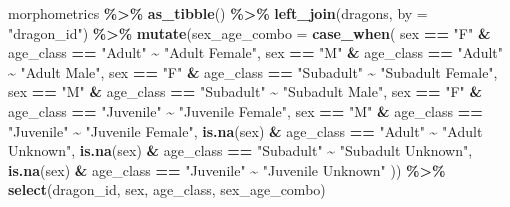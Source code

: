 \documentclass[
]{book}
\newenvironment{Shaded}{\begin{snugshade}}{\end{snugshade}}
\newcommand{\AttributeTok}[1]{\textcolor[rgb]{0.13,0.29,0.53}{#1}}
\newcommand{\FunctionTok}[1]{\textcolor[rgb]{0.13,0.29,0.53}{\textbf{#1}}}
\newcommand{\NormalTok}[1]{#1}
\newcommand{\SpecialCharTok}[1]{\textcolor[rgb]{0.81,0.36,0.00}{\textbf{#1}}}
\newcommand{\StringTok}[1]{\textcolor[rgb]{0.31,0.60,0.02}{#1}}
\begin{document}
\begin{Shaded}
\begin{Highlighting}[]
\NormalTok{morphometrics }\SpecialCharTok{\%\textgreater{}\%} 
  \FunctionTok{as\_tibble}\NormalTok{() }\SpecialCharTok{\%\textgreater{}\%} 
  \FunctionTok{left\_join}\NormalTok{(dragons, }\AttributeTok{by =} \StringTok{"dragon\_id"}\NormalTok{) }\SpecialCharTok{\%\textgreater{}\%} 
  \FunctionTok{mutate}\NormalTok{(}\AttributeTok{sex\_age\_combo =} \FunctionTok{case\_when}\NormalTok{(}
\NormalTok{    sex }\SpecialCharTok{==} \StringTok{"F"} \SpecialCharTok{\&}\NormalTok{ age\_class }\SpecialCharTok{==} \StringTok{"Adult"} \SpecialCharTok{\textasciitilde{}} \StringTok{"Adult Female"}\NormalTok{,}
\NormalTok{    sex }\SpecialCharTok{==} \StringTok{"M"} \SpecialCharTok{\&}\NormalTok{ age\_class }\SpecialCharTok{==} \StringTok{"Adult"} \SpecialCharTok{\textasciitilde{}} \StringTok{"Adult Male"}\NormalTok{,}
\NormalTok{    sex }\SpecialCharTok{==} \StringTok{"F"} \SpecialCharTok{\&}\NormalTok{ age\_class }\SpecialCharTok{==} \StringTok{"Subadult"} \SpecialCharTok{\textasciitilde{}} \StringTok{"Subadult Female"}\NormalTok{,}
\NormalTok{    sex }\SpecialCharTok{==} \StringTok{"M"} \SpecialCharTok{\&}\NormalTok{ age\_class }\SpecialCharTok{==} \StringTok{"Subadult"} \SpecialCharTok{\textasciitilde{}} \StringTok{"Subadult Male"}\NormalTok{,}
\NormalTok{    sex }\SpecialCharTok{==} \StringTok{"F"} \SpecialCharTok{\&}\NormalTok{ age\_class }\SpecialCharTok{==} \StringTok{"Juvenile"} \SpecialCharTok{\textasciitilde{}} \StringTok{"Juvenile Female"}\NormalTok{,}
\NormalTok{    sex }\SpecialCharTok{==} \StringTok{"M"} \SpecialCharTok{\&}\NormalTok{ age\_class }\SpecialCharTok{==} \StringTok{"Juvenile"} \SpecialCharTok{\textasciitilde{}} \StringTok{"Juvenile Female"}\NormalTok{,}
    \FunctionTok{is.na}\NormalTok{(sex) }\SpecialCharTok{\&}\NormalTok{ age\_class }\SpecialCharTok{==} \StringTok{"Adult"} \SpecialCharTok{\textasciitilde{}} \StringTok{"Adult Unknown"}\NormalTok{,}
    \FunctionTok{is.na}\NormalTok{(sex) }\SpecialCharTok{\&}\NormalTok{ age\_class }\SpecialCharTok{==} \StringTok{"Subadult"} \SpecialCharTok{\textasciitilde{}} \StringTok{"Subadult Unknown"}\NormalTok{,}
    \FunctionTok{is.na}\NormalTok{(sex) }\SpecialCharTok{\&}\NormalTok{ age\_class }\SpecialCharTok{==} \StringTok{"Juvenile"} \SpecialCharTok{\textasciitilde{}} \StringTok{"Juvenile Unknown"}
\NormalTok{    )) }\SpecialCharTok{\%\textgreater{}\%} 
  \FunctionTok{select}\NormalTok{(dragon\_id, sex, age\_class, sex\_age\_combo)}
\end{Highlighting}
\end{Shaded}
\end{document}
